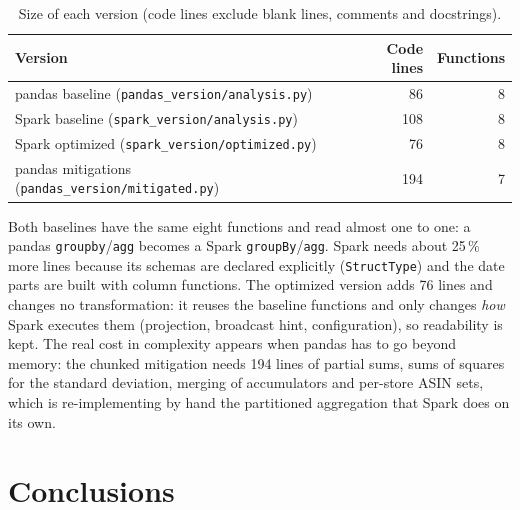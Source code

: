 \documentclass[11pt,a4paper]{article}
\begin{document}
\begin{table}[H]
\centering
\caption{Size of each version (code lines exclude blank lines, comments and docstrings).}
\label{tab:loc}
\begin{tabular}{lrr}
\toprule
Version & Code lines & Functions \\
\midrule
pandas baseline (\texttt{pandas\_version/analysis.py}) & 86 & 8 \\
Spark baseline (\texttt{spark\_version/analysis.py}) & 108 & 8 \\
Spark optimized (\texttt{spark\_version/optimized.py}) & 76 & 8 \\
pandas mitigations (\texttt{pandas\_version/mitigated.py}) & 194 & 7 \\
\bottomrule
\end{tabular}
\end{table}

Both baselines have the same eight functions and read almost one to one: a pandas
\texttt{groupby}/\texttt{agg} becomes a Spark \texttt{groupBy}/\texttt{agg}. Spark needs about
25\,\% more lines because its schemas are declared explicitly (\texttt{StructType}) and the
date parts are built with column functions. The optimized version adds 76 lines and changes no
transformation: it reuses the baseline functions and only changes \emph{how} Spark executes
them (projection, broadcast hint, configuration), so readability is kept. The real cost in
complexity appears when pandas has to go beyond memory: the chunked mitigation needs 194 lines
of partial sums, sums of squares for the standard deviation, merging of accumulators and
per-store ASIN sets, which is re-implementing by hand the partitioned aggregation that Spark
does on its own.

\section{Conclusions}
\end{document}
